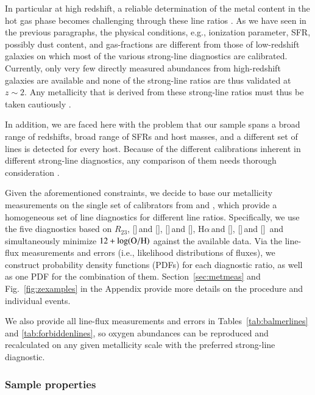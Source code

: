 \documentclass[traditabstract, longauth]{aa}
\newcommand{\ha}{H$\alpha$}
\newcommand{\oh}{12+\log(\rm{O/H})}
\newcommand{\oii}{[\ion{O}{ii}]}
\newcommand{\oiii}{[\ion{O}{iii}]}
\newcommand{\neiii}{[\ion{Ne}{iii}]}
\newcommand{\nii}{[\ion{N}{ii}]}
\begin{document}
In particular at high redshift, a reliable determination of the metal content in the hot gas phase becomes challenging through these line ratios \citep[e.g.,][]{2008A&A...488..463M}. As we have seen in the previous paragraphs, the physical conditions, e.g., ionization parameter, SFR, possibly dust content, and gas-fractions are different from those of low-redshift galaxies on which most of the various strong-line diagnostics are calibrated. Currently, only very few directly measured abundances from high-redshift galaxies are available \citep[e.g.,][]{2012MNRAS.427.1973C} and none of the strong-line ratios are thus validated at $z\sim2$. Any metallicity that is derived from these strong-line ratios must thus be taken cautiously \citep[e.g.,][]{2014ApJ...795..165S}.

In addition, we are faced here with the problem that our sample spans a broad range of redshifts, broad range of SFRs and host masses, and a different set of lines is detected for every host. Because of the different calibrations inherent in different strong-line diagnostics, any comparison of them needs thorough consideration \citep[e.g.,][]{2008ApJ...681.1183K}.

Given the aforementioned constraints, we decide to base our metallicity measurements on the single set of calibrators from \citet{2006A&A...459...85N} and \citet{2008A&A...488..463M}, which provide a homogeneous set of line diagnostics for different line ratios. Specifically, we use the five diagnostics based on $R_{23}$, \oii\,and \neiii, \oiii\,and \nii, \ha\,and \nii, \nii\,and \oii\, and simultaneously minimize $\oh$ against the available data. Via the line-flux measurements and errors (i.e., likelihood distributions of fluxes), we construct probability density functions (PDFs) for each diagnostic ratio, as well as one PDF for the combination of them. Section~\ref{sec:metmeas} and Fig.~\ref{fig:zexamples} in the Appendix provide more details on the procedure and individual events. 

We also provide all line-flux measurements and errors in Tables~\ref{tab:balmerlines} and \ref{tab:forbiddenlines}, so oxygen abundances can be reproduced and recalculated on any given metallicity scale with the preferred strong-line diagnostic.

\subsubsection{Sample properties}
\label{sec:metprop}
\end{document}
